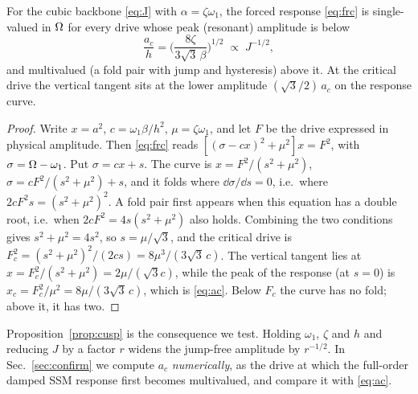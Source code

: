 \begin{proposition}\label{prop:cusp}
For the cubic backbone \eqref{eq:J} with $\alpha=\zeta\omega_1$, the forced response
\eqref{eq:frc} is single-valued in $\Omega$ for every drive whose peak (resonant) amplitude is
below
\begin{equation}
\frac{a_c}{h}=\Big(\frac{8\zeta}{3\sqrt3\,\beta}\Big)^{1/2}\;\propto\;J^{-1/2},
\label{eq:ac}
\end{equation}
and multivalued (a fold pair with jump and hysteresis) above it. At the critical drive the
vertical tangent sits at the lower amplitude $(\sqrt3/2)\,a_c$ on the response curve.
\end{proposition}
\begin{proof}
Write $x=a^2$, $c=\omega_1\beta/h^2$, $\mu=\zeta\omega_1$, and let $F$ be the drive
expressed in physical amplitude. Then \eqref{eq:frc} reads
$[(\sigma-cx)^2+\mu^2]x=F^2$, with $\sigma=\Omega-\omega_1$. Put $\sigma=cx+s$. The curve is
$x=F^2/(s^2+\mu^2)$, $\sigma=cF^2/(s^2+\mu^2)+s$, and it folds where $\dd\sigma/\dd s=0$,
i.e.\ where $2cF^2s=(s^2+\mu^2)^2$. A fold pair first appears when this equation has a
double root, i.e.\ when $2cF^2=4s(s^2+\mu^2)$ also holds. Combining the two conditions
gives $s^2+\mu^2=4s^2$, so $s=\mu/\sqrt3$, and the critical drive is
$F_c^2=(s^2+\mu^2)^2/(2cs)=8\mu^3/(3\sqrt3\,c)$. The vertical tangent lies at
$x=F_c^2/(s^2+\mu^2)=2\mu/(\sqrt3c)$, while the peak of the response (at $s=0$) is
$x_c=F_c^2/\mu^2=8\mu/(3\sqrt3\,c)$, which is \eqref{eq:ac}. Below $F_c$ the curve has no
fold; above it, it has two.
\end{proof}
\noindent Proposition~\ref{prop:cusp} is the consequence we test. Holding $\omega_1$,
$\zeta$ and $h$ and reducing $J$ by a factor $r$ widens the jump-free amplitude by
$r^{-1/2}$. In Sec.~\ref{sec:confirm} we compute $a_c$ \emph{numerically}, as the drive
at which the full-order damped SSM response first becomes multivalued, and compare it
with \eqref{eq:ac}.
